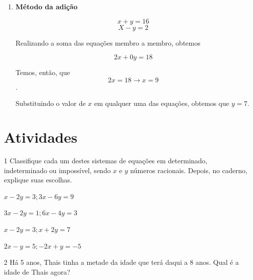 {\begin{enumerate}
Agora, substituiremos o valor de $x$ na segunda equação:

II) $$2x + 3y = 10$$
    $$2 ( y -- 5) + 3y = 10$$
    $$2y - 10 + 3y = 10$$
    $$5y = 20$$
    $$y = 4$$

Como sabemos o valor de $y$, agora basta substituir o valor de $y$ em
qualquer uma das duas equações para obtermos $x = -1$.

\item \textbf{Método da adição}

$$x + y = 16$$
$$X - y = 2$$

Realizando a soma das equações membro a membro, obtemos

$$2x + 0y = 18$$

Temos, então, que $$2x = 18 \rightarrow x = 9$$.

Substituindo o valor de $x$ em qualquer uma das equações, obtemos que $y =
7$.
\end{enumerate}
}



\section*{Atividades}

\num{1} Classifique cada um destes sistemas de equações em determinado,
indeterminado ou impossível, sendo $x$ e $y$ números racionais.
Depois, no caderno, explique suas escolhas.

\begin{escolha}[itemsep=0pt]
\item $x - 2y = 3; 3x - 6y = 9$\\

\item $3x - 2y = 1; 6x - 4y = 3$\\

\item $x - 2y = 3; x + 2y = 7$\\

\item $2x - y = 5; -2x + y = -5$\\
\end{escolha}






\num{2} Há 5 anos, Thais tinha a metade da idade que terá daqui a 8 anos.
Qual é a idade de Thais agora?

